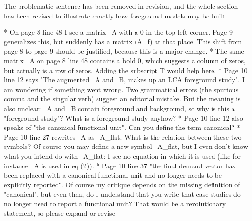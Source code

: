 \documentclass[11pt,letterpaper]{article}
\begin{document}
The problematic sentence has been removed in revision, and the whole section has been revised to illustrate exactly how foreground models may be built.

* On page 8 line 48 I see a matrix ~A with a 0 in the top-left corner. Page 9 generalizes this, but suddenly has a matrix (A_f) at that place. This shift from page 8 to page 9 should be justified, because this is a major change.
* The same matrix ~A on page 8 line 48 contains a bold 0, which suggests a column of zeros, but actually is a row of zeros. Adding the subscript T would help here.
* Page 10 line 12 says "The augmented ~A and ~B, makes up an LCA foreground study". I am wondering if something went wrong. Two grammatical errors (the spurious comma and the singular verb) suggest an editorial mistake. But the meaning is also unclear: ~A and ~B contain foreground and background, so why is this a "foreground study"? What is a foreground study anyhow?
* Page 10 line 12 also speaks of "the canonical functional unit". Can you define the term canonical?
* Page 10 line 27 rewrites ~A as ~A_flat. What is the relation between these two symbols? Of course you may define a new symbol ~A_flat, but I even don't know what you intend do with ~A_flat: I see no equation in which it is used (like for instance ~A is used in eq (2)).
* Page 10 line 37 "the final demand vector has been replaced with a canonical functional unit and no longer needs to be explicitly reported". Of course my critique depends on the missing definition of "canonical", but even then, do I understand that you write that case studies do no longer need to report a functional unit? That would be a revolutionary statement, so please expand or revise. 
\end{document}
